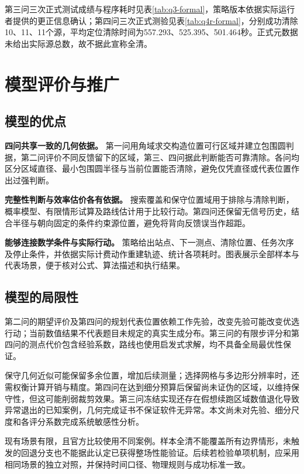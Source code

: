 \documentclass[UTF8,a4paper,zihao=-4,fontset=none]{ctexart}
\begin{document}
第三问三次正式测试成绩与程序耗时见表\ref{tab:q3-formal}，策略版本依据实际运行者提供的更正信息确认；第四问三次正式测验见表\ref{tab:q4r-formal}，分别成功清除10、11、11个源，平均定位清除时间为557.293、525.395、501.464秒。正式元数据未给出实际源总数，故不据此宣称全清。

\section{模型评价与推广}

\subsection{模型的优点}

\textbf{四问共享一致的几何依据。} 第一问用角域求交构造位置可行区域并建立包围圆判据，第二问评价不同反馈留下的区域，第三、四问据此判断能否可靠清除。各问均区分区域直径、最小包围圆半径与当前位置能否清除，避免仅凭直径或代表位置作出过强判断。

\textbf{完整性判断与效率估价各有依据。} 搜索覆盖和保守位置域用于排除与清除判断，概率模型、有限情形试算及路线估计用于比较行动。第四问还保留无信号历史，结合半径与朝向固定的条件约束源位置，避免将背向反馈误当作超距。

\textbf{能够连接数学条件与实际行动。} 策略给出站点、下一测点、清除位置、任务次序及停止条件，并依据实际计费动作重建轨迹、统计各项耗时。图表展示全部样本与代表场景，便于核对公式、算法描述和执行结果。

\subsection{模型的局限性}

第二问的期望评价及第四问的规划代表位置依赖工作先验，改变先验可能改变优选行动；当前数值结果不代表题目未规定的真实生成分布。第三问的有限步评分和第四问的测点代价包含经验系数，路线也使用启发式求解，均不具备全局最优性保证。

保守几何近似可能保留多余位置，增加后续测量；选择网格与多边形分辨率时，还需权衡计算开销与精度。第四问在达到细分预算后保留尚未证伪的区域，以维持保守性，但这可能削弱裁剪效果。第三问冻结实现还存在假想续跑区域数值退化导致异常退出的已知案例，几何完成证书不保证软件无异常。本文尚未对先验、细分尺度和各评分系数完成系统敏感性分析。

现有场景有限，且官方比较使用不同案例。样本全清不能覆盖所有边界情形，未触发的回退分支也不能据此认定已获得整场性能验证。后续若检验单项机制，应采用相同场景的独立对照，并保持时间口径、物理规则与成功标准一致。
\end{document}

